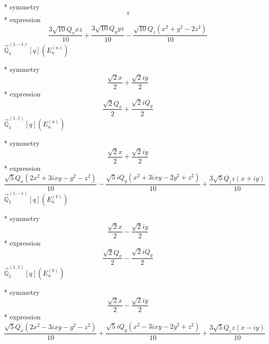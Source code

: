 \documentclass[fleqn,8pt]{jsarticle}
\begin{document}
\noindent\quad ** symmetry
\begin{dmath*}
z
\end{dmath*}
\noindent\quad ** expression
\begin{dmath*}
\frac{3 \sqrt{10} Q_{x} x z}{10} + \frac{3 \sqrt{10} Q_{y} y z}{10} - \frac{\sqrt{10} Q_{z} \left(x^{2} + y^{2} - 2 z^{2}\right)}{10}
\end{dmath*}
\noindent\quad $\vec{\mathbb{Q}}_{1}^{(1,-1)}[q](E_{u}^{(a)})$

\noindent\quad ** symmetry
\begin{dmath*}
\frac{\sqrt{2} x}{2} + \frac{\sqrt{2} i y}{2}
\end{dmath*}
\noindent\quad ** expression
\begin{dmath*}
\frac{\sqrt{2} Q_{x}}{2} + \frac{\sqrt{2} i Q_{y}}{2}
\end{dmath*}
\noindent\quad $\vec{\mathbb{Q}}_{1}^{(1,1)}[q](E_{u}^{(a)})$

\noindent\quad ** symmetry
\begin{dmath*}
\frac{\sqrt{2} x}{2} + \frac{\sqrt{2} i y}{2}
\end{dmath*}
\noindent\quad ** expression
\begin{dmath*}
\frac{\sqrt{5} Q_{x} \left(2 x^{2} + 3 i x y - y^{2} - z^{2}\right)}{10} - \frac{\sqrt{5} i Q_{y} \left(x^{2} + 3 i x y - 2 y^{2} + z^{2}\right)}{10} + \frac{3 \sqrt{5} Q_{z} z \left(x + i y\right)}{10}
\end{dmath*}
\noindent\quad $\vec{\mathbb{Q}}_{1}^{(1,-1)}[q](E_{u}^{(b)})$

\noindent\quad ** symmetry
\begin{dmath*}
\frac{\sqrt{2} x}{2} - \frac{\sqrt{2} i y}{2}
\end{dmath*}
\noindent\quad ** expression
\begin{dmath*}
\frac{\sqrt{2} Q_{x}}{2} - \frac{\sqrt{2} i Q_{y}}{2}
\end{dmath*}
\noindent\quad $\vec{\mathbb{Q}}_{1}^{(1,1)}[q](E_{u}^{(b)})$

\noindent\quad ** symmetry
\begin{dmath*}
\frac{\sqrt{2} x}{2} - \frac{\sqrt{2} i y}{2}
\end{dmath*}
\noindent\quad ** expression
\begin{dmath*}
\frac{\sqrt{5} Q_{x} \left(2 x^{2} - 3 i x y - y^{2} - z^{2}\right)}{10} + \frac{\sqrt{5} i Q_{y} \left(x^{2} - 3 i x y - 2 y^{2} + z^{2}\right)}{10} + \frac{3 \sqrt{5} Q_{z} z \left(x - i y\right)}{10}
\end{dmath*}
\end{document}
